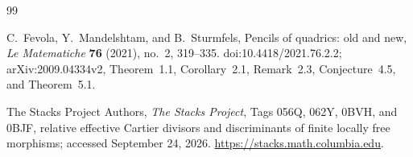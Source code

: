 \begin{thebibliography}{99}

C.~Fevola, Y.~Mandelshtam, and B.~Sturmfels,
Pencils of quadrics: old and new,
\emph{Le Matematiche} \textbf{76} (2021), no.~2, 319--335.
doi:10.4418/2021.76.2.2; arXiv:2009.04334v2,
Theorem~1.1, Corollary~2.1, Remark~2.3, Conjecture~4.5, and Theorem~5.1.

The Stacks Project Authors,
\emph{The Stacks Project}, Tags 056Q, 062Y, 0BVH, and 0BJF,
relative effective Cartier divisors and discriminants of finite locally
free morphisms; accessed September 24, 2026.
\url{https://stacks.math.columbia.edu}.
\end{thebibliography}
